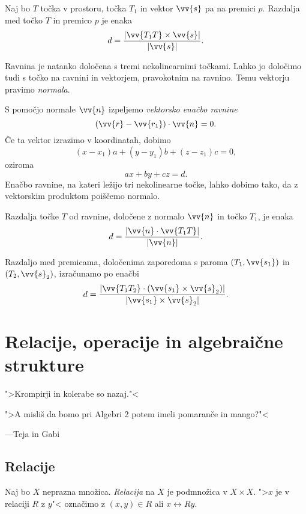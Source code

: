 \documentclass[12pt, a4paper]{article}
\begin{document}
\begin{trditev}
Naj bo $T$ točka v prostoru, točka $T_1$ in vektor $\vv{s}$ pa na premici $p$. Razdalja med točko $T$ in premico $p$ je enaka
\[
d=\frac{\left|\vv{T_1T}\times\vv{s}\right|}{\left|\vv{s}\right|}.
\]
\end{trditev}

Ravnina je natanko določena s tremi nekolinearnimi točkami. Lahko jo določimo tudi s točko na ravnini in vektorjem, pravokotnim na ravnino. Temu vektorju pravimo \emph{normala}.

S pomočjo normale $\vv{n}$ izpeljemo \emph{vektorsko enačbo ravnine}
\[
(\vv{r}-\vv{r_1})\cdot\vv{n}=0.
\]
Če ta vektor izrazimo v koordinatah, dobimo
\[
(x-x_1)a+(y-y_1)b+(z-z_1)c=0,
\]
oziroma
\[
ax+by+cz=d.
\]
Enačbo ravnine, na kateri ležijo tri nekolinearne točke, lahko dobimo tako, da z vektorskim produktom poiščemo normalo.

\begin{trditev}
Razdalja točke $T$ od ravnine, določene z normalo $\vv{n}$ in točko $T_1$, je enaka
\[
d=\frac{\left|\vv{n}\cdot\vv{T_1T}\right|}{\left|\vv{n}\right|}.
\]
\end{trditev}

\begin{trditev}
Razdaljo med premicama, določenima zaporedoma s paroma $(T_1,\vv{s_1})$ in $(T_2,\vv{s}_2)$, izračunamo po enačbi
\[
d=\frac{\left|\vv{T_1T_2}\cdot(\vv{s_1}\times\vv{s}_2)\right|}{\left|\vv{s_1}\times\vv{s}_2\right|}.
\]
\end{trditev}

\newpage

\section{Relacije, operacije in algebraične strukture}

\epigraph{">Krompirji in kolerabe so nazaj."<

">A misliš da bomo pri Algebri 2 potem imeli pomaranče in mango?"<}{---Teja in Gabi}

\subsection{Relacije}

\begin{okvir}
\begin{definicija}
Naj bo $X$ neprazna množica. \emph{Relacija} na $X$ je podmnožica v $X\times X$. ">$x$ je v relaciji $R$ z $y$"< označimo z $(x,y)\in R$ ali $x\rel{R}y$.
\end{definicija}
\end{okvir}
\end{document}
